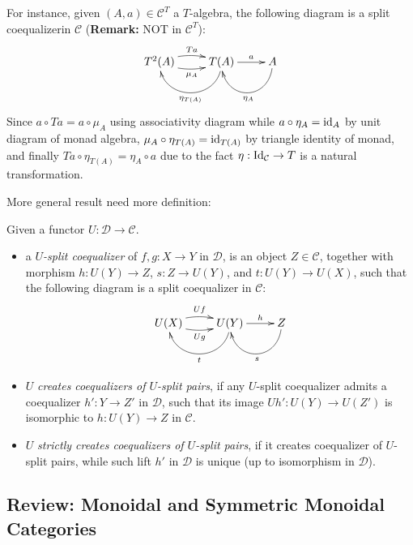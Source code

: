 \documentclass{article}
\begin{document}
For instance, given $(A,a)\in \mathcal{C}^T$ a $T$-algebra, the following diagram is a split coequalizerin $\mathcal{C}$ (\textbf{Remark:} NOT in $\mathcal{C}^T$):
\[\xymatrix{
    T^2(A) \ar@/_{-.5pc}/[r]^-{Ta} \ar@/_{.5pc}/[r]_-{\mu_A} & T(A) \ar@(d,d)[l]^-{\eta_{T(A)}} \ar[r]^-{a} & A \ar@(d,d)[l]^-{\eta_A}
}\]
Since $a\circ Ta = a\circ \mu_A$ using associativity diagram while $a\circ \eta_A = \mathrm{id}_A$ by unit diagram of monad algebra, $\mu_A\circ \eta_{T(A)}=\mathrm{id}_{T(A)}$ by triangle identity of monad, and finally $Ta \circ \eta_{T(A)}=\eta_A\circ a$ due to the fact $\eta:\mathrm{Id}_\mathcal{C}\rightarrow T$ is a natural transformation.

\hfil

More general result need more definition:
\begin{defn}
    Given a functor $U:\mathcal{D}\rightarrow\mathcal{C}$.
    \begin{itemize}
        \item a \emph{$U$-split coequalizer} of $f,g:X\rightarrow Y$ in $\mathcal{D}$, is an object $Z\in\mathcal{C}$, together with morphism $h:U(Y)\rightarrow Z$, $s:Z\rightarrow U(Y)$, and $t:U(Y)\rightarrow U(X)$, such that the following diagram is a split coequalizer in $\mathcal{C}$:
        \[\xymatrix{
            U(X) \ar@/_{-.5pc}/[r]^-{Uf} \ar@/_{.5pc}/[r]_-{Ug} & U(Y) \ar@(d,d)[l]^-{t} \ar[r]^-{h} & Z \ar@(d,d)[l]^-{s}
        }\]
        \item $U$ \emph{creates coequalizers of $U$-split pairs}, if any $U$-split coequalizer admits a coequalizer $h':Y\rightarrow Z'$ in $\mathcal{D}$, such that its image $Uh':U(Y)\rightarrow U(Z')$ is isomorphic to $h:U(Y)\rightarrow Z$ in $\mathcal{C}$.
        \item $U$ \emph{strictly creates coequalizers of $U$-split pairs}, if it creates coequalizer of $U$-split pairs, while such lift $h'$ in $\mathcal{D}$ is unique (up to isomorphism in $\mathcal{D}$).
    \end{itemize}
\end{defn}

\subsection{Review: Monoidal and Symmetric Monoidal Categories}
 
\end{document}
